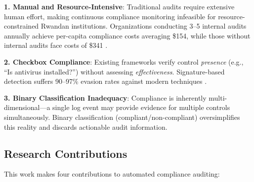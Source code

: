 \documentclass[11pt,conference]{IEEEtran}
\begin{document}
\textbf{1. Manual and Resource-Intensive}: Traditional audits require extensive human effort, making continuous compliance monitoring infeasible for resource-constrained Rwandan institutions. Organizations conducting 3--5 internal audits annually achieve per-capita compliance costs averaging \$154, while those without internal audits face costs of \$341 \cite{ponemon_cost}.

\textbf{2. Checkbox Compliance}: Existing frameworks verify control \textit{presence} (e.g., ``Is antivirus installed?'') without assessing \textit{effectiveness}. Signature-based detection suffers 90--97\% evasion rates against modern techniques \cite{dp_payload_paper, reverse_shell_paper}.

\textbf{3. Binary Classification Inadequacy}: Compliance is inherently multi-dimensional---a single log event may provide evidence for multiple controls simultaneously. Binary classification (compliant/non-compliant) oversimplifies this reality and discards actionable audit information.

\subsection{Research Contributions}

This work makes four contributions to automated compliance auditing:
\end{document}
